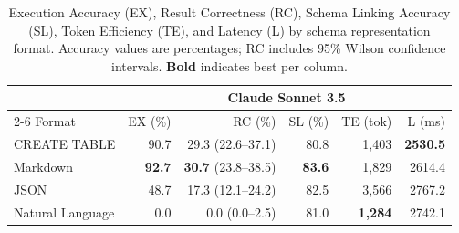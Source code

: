 \begin{table}[t]
\centering
\caption{Execution Accuracy (EX), Result Correctness (RC), Schema Linking Accuracy (SL), Token Efficiency (TE), and Latency (L) by schema representation format. Accuracy values are percentages; RC includes 95\% Wilson confidence intervals. \textbf{Bold} indicates best per column.}
\label{tab:format_comparison}
\footnotesize
\begin{tabular}{lrrrrr}
\toprule
 & \multicolumn{5}{c}{Claude Sonnet 3.5} \\
\cmidrule(lr){2-6}
Format & EX (\%) & RC (\%) & SL (\%) & TE (tok) & L (ms) \\
\midrule
CREATE TABLE & 90.7 & 29.3 (22.6--37.1) & 80.8 & 1,403 & \textbf{2530.5} \\
Markdown & \textbf{92.7} & \textbf{30.7} (23.8--38.5) & \textbf{83.6} & 1,829 & 2614.4 \\
JSON & 48.7 & 17.3 (12.1--24.2) & 82.5 & 3,566 & 2767.2 \\
Natural Language & 0.0 & 0.0 (0.0--2.5) & 81.0 & \textbf{1,284} & 2742.1 \\
\bottomrule
\end{tabular}
\end{table}